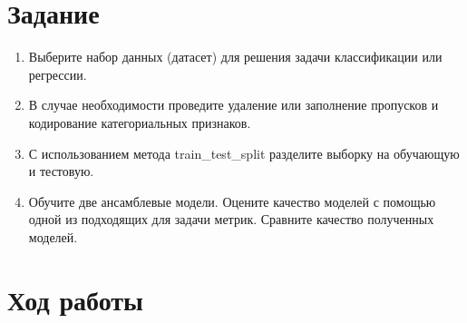 \documentclass[a4paper]{article}
\begin{document}
  \section*{Задание}
  \begin{enumerate}
    \item Выберите набор данных (датасет) для решения задачи классификации или регрессии.
    \item В случае необходимости проведите удаление или заполнение пропусков и кодирование категориальных признаков.
    \item С использованием метода train\_test\_split разделите выборку на обучающую и тестовую.
    \item
      Обучите две ансамблевые модели.
      Оцените качество моделей с помощью одной из подходящих для задачи метрик.
      Сравните качество полученных моделей.
  \end{enumerate}

  \section*{Ход работы}
  \clearpage
  
\end{document}
